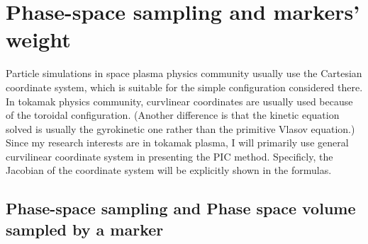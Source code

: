 \documentclass{article}
\begin{document}
\section{Phase-space sampling and markers' weight}

Particle simulations in space plasma physics community usually use the
Cartesian coordinate system, which is suitable for the simple configuration
considered there. In tokamak physics community, curvlinear coordinates are
usually used because of the toroidal configuration. (Another difference is
that the kinetic equation solved is usually the gyrokinetic one rather than
the primitive Vlasov equation.) Since my research interests are in tokamak
plasma, I will primarily use general curvilinear coordinate system in
presenting the PIC method. Specificly, the Jacobian of the coordinate system
will be explicitly shown in the formulas.

\subsection{Phase-space sampling and Phase space volume sampled by a marker}
\end{document}
